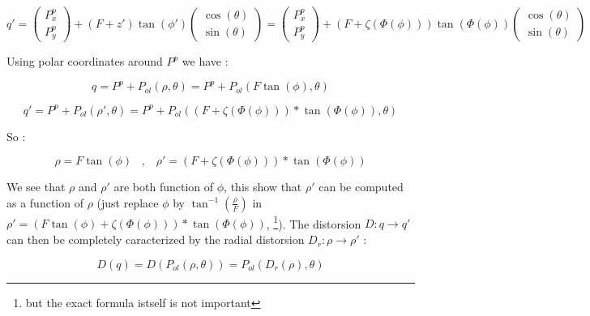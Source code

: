 \begin{equation}
	q' =     \begin{pmatrix} P^p_x \\ P^p_y \end{pmatrix} +  (F+z') \tan(\phi')   \begin{pmatrix} \cos(\theta) \\ \sin(\theta) \end{pmatrix} 
		=     \begin{pmatrix} P^p_x \\ P^p_y \end{pmatrix} +  (F+\zeta(\Phi(\phi))) \tan(\Phi(\phi))   \begin{pmatrix} \cos(\theta) \\ \sin(\theta) \end{pmatrix} 
\end{equation}

Using polar coordinates around $P^p$ we have :

\begin{equation}
	q = P^p + P_{ol}(\rho,\theta) =  P^p+  P_{ol} ( F \tan(\phi), \theta) \label{PolInit} 
\end{equation}

\begin{equation}
	q' = P^p+   P_{ol}(\rho',\theta) =  P^p+  P_{ol}( (F+\zeta(\Phi(\phi))) * \tan(\Phi(\phi)), \theta) \label{PolDist}
\end{equation}

So : 

\begin{equation}
       \rho = F \tan(\phi)   \;\;\; , \;\;\;  \rho' = (F+\zeta(\Phi(\phi))) * \tan(\Phi(\phi))   \label{RhoPhi}
\end{equation}

We see that $\rho$ and $\rho'$ are both function of $\phi$, this show that $\rho'$ can be
computed as a function of $\rho$ (just replace $\phi$ by $\tan^{-1}(\frac{\rho}{F})$ in  $\rho'= (F \tan(\phi) +\zeta(\Phi(\phi))) * \tan(\Phi(\phi))$,
\footnote{but the exact formula istself is not important}).
The distorsion $D : q \rightarrow q' $ can then be completely caracterized by the radial distorsion
$D_r : \rho \rightarrow  \rho'$ :

\begin{equation}
	D(q)  =   D(P_{ol}(\rho,\theta))  =   P_{ol}(D_r(\rho),\theta)
\end{equation}


